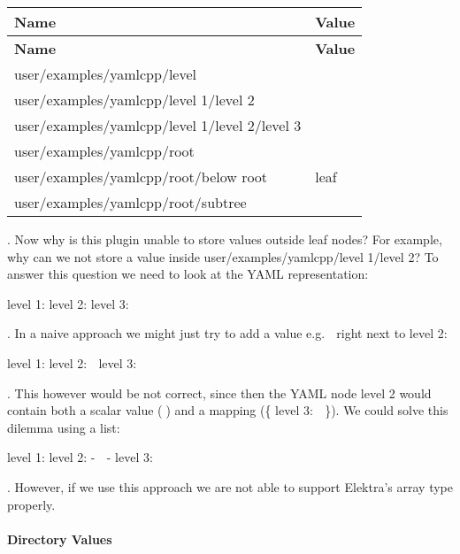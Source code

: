 \tabulinesep=1mm
\begin{longtabu} spread 0pt [c]{*{2}{|X[-1]}|}
\hline
\rowcolor{\tableheadbgcolor}\textbf{ Name }&\textbf{ Value  }\\
\endfirsthead
\hline
\endfoot
\hline
\rowcolor{\tableheadbgcolor}\textbf{ Name }&\textbf{ Value  }\\
\endhead
user/examples/yamlcpp/level &\\
user/examples/yamlcpp/level 1/level 2 &\\
user/examples/yamlcpp/level 1/level 2/level 3 &🍁 \\
user/examples/yamlcpp/root &\\
user/examples/yamlcpp/root/below root &leaf \\
user/examples/yamlcpp/root/subtree &🍂 \\
\end{longtabu}
. Now why is this plugin unable to store values outside leaf nodes? For example, why can we not store a value inside {\ttfamily user/examples/yamlcpp/level 1/level 2}? To answer this question we need to look at the Y\+A\+ML representation\+:


\begin{DoxyCode}
level 1:
  level 2:
    level 3:  🍁
\end{DoxyCode}


. In a naive approach we might just try to add a value e.\+g. {\ttfamily 🙈} right next to level 2\+:


\begin{DoxyCode}
level 1:
  level 2: 🙈
    level 3:  🍁
\end{DoxyCode}


. This however would be not correct, since then the Y\+A\+ML node {\ttfamily level 2} would contain both a scalar value ({\ttfamily 🙈}) and a mapping ({\ttfamily \{ level 3\+: 🍁 \}}). We could solve this dilemma using a list\+:


\begin{DoxyCode}
level 1:
  level 2:
    - 🙈
    - level 3:  🍁
\end{DoxyCode}


. However, if we use this approach we are not able to support Elektra’s array type properly.

\paragraph*{Directory Values}

